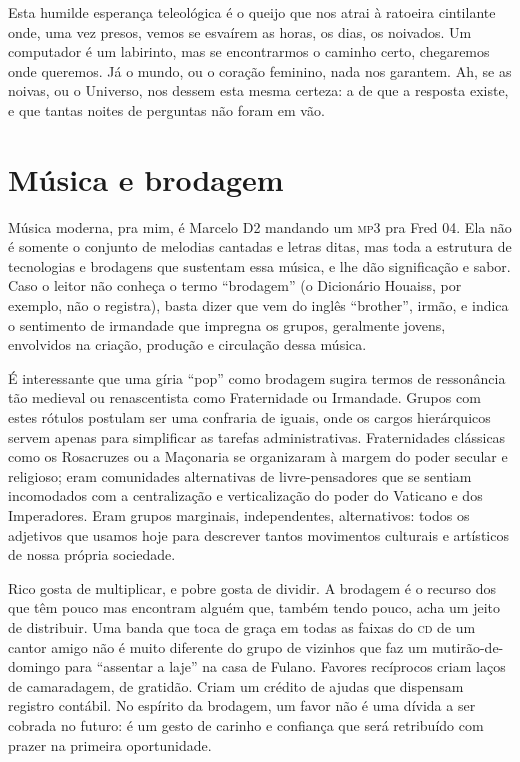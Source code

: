 Esta humilde esperança teleológica é o queijo que nos atrai à ratoeira
cintilante onde, uma vez presos, vemos se esvaírem as horas, os dias,
os noivados. Um computador é um labirinto, mas se encontrarmos o
caminho certo, chegaremos onde queremos.  Já o mundo, ou o coração
feminino, nada nos garantem. Ah, se as noivas, ou o Universo, nos
dessem esta mesma certeza: a de que a resposta existe, e que tantas
noites de perguntas não foram em vão.

\chapter{Música e brodagem}

Música moderna, pra mim, é Marcelo D2 mandando um \textsc{mp3} pra Fred 04. Ela
não é somente o conjunto de melodias cantadas e letras ditas, mas
toda a estrutura de tecnologias e brodagens que sustentam essa
música, e lhe dão significação e sabor.  Caso o leitor não conheça o
termo “brodagem” (o Dicionário Houaiss, por exemplo, não o registra),
basta dizer que vem do inglês “brother”, irmão, e indica o sentimento
de irmandade que impregna os grupos, geralmente jovens, envolvidos na
criação, produção e circulação dessa música.

É interessante que uma gíria “pop” como brodagem sugira termos de
ressonância tão medieval ou renascentista como Fraternidade ou
Irmandade. Grupos com estes rótulos postulam ser uma confraria de
iguais, onde os cargos hierárquicos servem apenas para simplificar as
tarefas administrativas. Fraternidades clássicas como os Rosacruzes
ou a Maçonaria se organizaram à margem do poder secular e religioso;
eram comunidades alternativas de livre-pensadores que se sentiam
incomodados com a centralização e verticalização do poder do Vaticano
e dos Imperadores. Eram grupos marginais, independentes,
alternativos: todos os adjetivos que usamos hoje para descrever
tantos movimentos culturais e artísticos de nossa própria sociedade.

Rico gosta de multiplicar, e pobre gosta de dividir. A brodagem é o
recurso dos que têm pouco mas encontram alguém que, também tendo
pouco, acha um jeito de distribuir. Uma banda que toca de graça em
todas as faixas do \textsc{cd} de um cantor amigo não é muito diferente do
grupo de vizinhos que faz um mutirão-de-domingo para “assentar a
laje” na casa de Fulano. Favores recíprocos criam laços de
camaradagem, de gratidão. Criam um crédito de ajudas que dispensam
registro contábil. No espírito da brodagem, um favor não é uma dívida
a ser cobrada no futuro: é um gesto de carinho e confiança que será
retribuído com prazer na primeira oportunidade.

